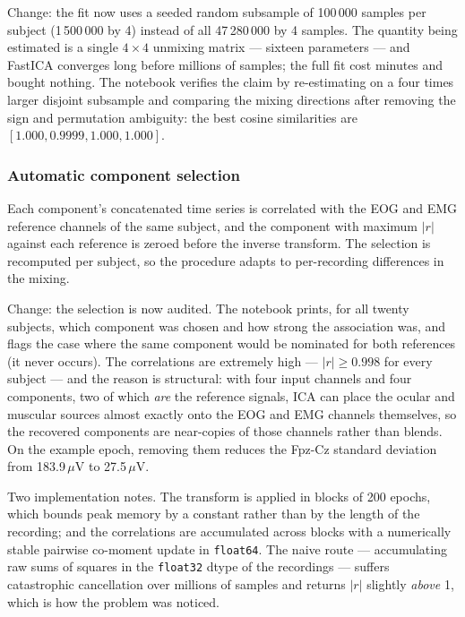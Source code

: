 \documentclass[11pt,a4paper]{article}
\newcommand{\volt}{V}
\newcommand{\micro}{\ensuremath{\mu}}
\newcommand{\num}[1]{#1}
\newcommand{\SI}[2]{#1\,#2}
\newcommand{\change}[1]{\textcolor{black!70}{\textsf{\footnotesize #1}}}
\begin{document}
\change{Change: the fit now uses a seeded random subsample of \num{100\,000} samples per subject
(\num{1\,500\,000} by 4) instead of all \num{47\,280\,000} by 4 samples. The quantity being estimated is
a single $4\times4$ unmixing matrix --- sixteen parameters --- and FastICA converges long before
millions of samples; the full fit cost minutes and bought nothing. The notebook verifies the
claim by re-estimating on a four times larger disjoint subsample and comparing the mixing
directions after removing the sign and permutation ambiguity: the best cosine similarities are
$[1.000, 0.9999, 1.000, 1.000]$.}

\subsubsection{Automatic component selection}
\label{sec:p2sel}

Each component's concatenated time series is correlated with the EOG and EMG reference channels
of the same subject, and the component with maximum $|r|$ against each reference is zeroed
before the inverse transform. The selection is recomputed per subject, so the procedure adapts
to per-recording differences in the mixing.

\change{Change: the selection is now audited. The notebook prints, for all twenty subjects,
which component was chosen and how strong the association was, and flags the case where the
same component would be nominated for both references (it never occurs).} The correlations are
extremely high --- $|r| \ge 0.998$ for every subject --- and the reason is structural: with four
input channels and four components, two of which \emph{are} the reference signals, ICA can
place the ocular and muscular sources almost exactly onto the EOG and EMG channels themselves,
so the recovered components are near-copies of those channels rather than blends. On the
example epoch, removing them reduces the Fpz-Cz standard deviation from \SI{183.9}{\micro\volt}
to \SI{27.5}{\micro\volt}.

Two implementation notes. The transform is applied in blocks of \num{200} epochs, which bounds
peak memory by a constant rather than by the length of the recording; and the correlations are
accumulated across blocks with a numerically stable pairwise co-moment update in
\texttt{float64}. The naive route --- accumulating raw sums of squares in the \texttt{float32}
dtype of the recordings --- suffers catastrophic cancellation over millions of samples and
returns $|r|$ slightly \emph{above} 1, which is how the problem was noticed.
\end{document}
